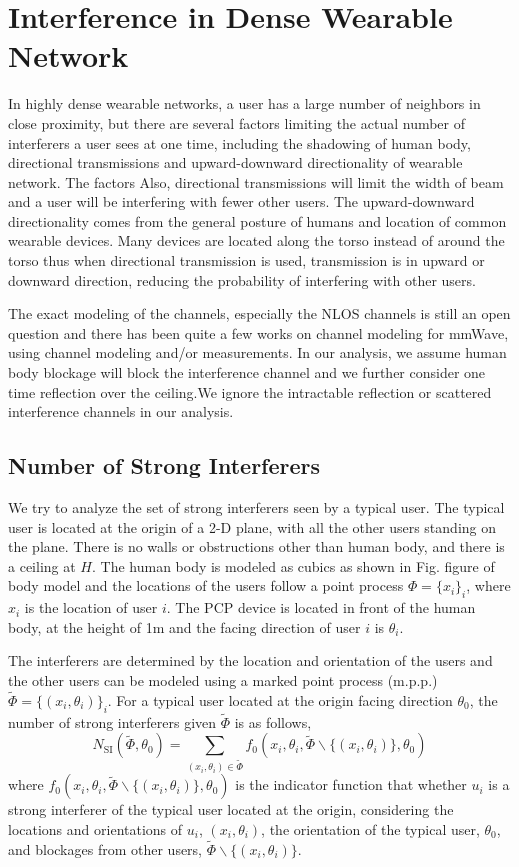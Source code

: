 \documentclass[10pt, conference, letterpaper]{IEEEtran}
\begin{document}
\section{Interference in Dense Wearable Network}\label{section:channel}
In highly dense wearable networks, a user has a large number of neighbors in close proximity, but there are several factors limiting the actual number of interferers a user sees at one time, including the shadowing of human body, directional transmissions and upward-downward directionality of wearable network. The factors Also, directional transmissions will limit the width of beam and a user will be interfering with fewer other users. The upward-downward directionality comes from the general posture of humans and location of common wearable devices. Many devices are located along the torso instead of around the torso thus when directional transmission is used, transmission is in upward or downward direction, reducing the probability of interfering with other users. 

The exact modeling of the channels, especially the NLOS channels is still an open question and there has been quite a few works on channel modeling for mmWave, using channel modeling and/or measurements. In our analysis, we assume human body blockage will block the interference channel and we further consider one time reflection over the ceiling.We ignore the intractable reflection or scattered interference channels in our analysis.
 
\subsection{Number of Strong Interferers}
We try to analyze the set of strong interferers seen by a typical user. The typical user is located at the origin of a 2-D plane, with all the other users standing on the plane. There is no walls or obstructions other than human body, and there is a ceiling at $H$. The human body is modeled as cubics as shown in Fig. {figure of body model} and the locations of the users follow a point process $\Phi=\{x_i\}_i$, where $x_i$ is the location of user $i$. The PCP device is located in front of the human body, at the height of 1m and the facing direction of user $i$ is $\theta_i$. 

The interferers are determined by the location and orientation of the users and the other users can be modeled using a marked point process (m.p.p.) $\tilde{\Phi}=\{(x_i, \theta_i)\}_i$. For a typical user located at the origin facing direction $\theta_0$, the number of strong interferers given $\tilde{\Phi}$ is as follows,
\begin{equation}
N_{\mathrm{SI}}(\tilde{\Phi}, \theta_0) = \sum_{(x_i, \theta_i)\in \tilde{\Phi}}f_0(x_i, \theta_i, \tilde{\Phi}\backslash\{(x_i,\theta_i)\}, \theta_0)
\end{equation}
where $f_0(x_i, \theta_i, \tilde{\Phi}\backslash\{(x_i,\theta_i)\}, \theta_0)$ is the indicator function that whether $u_i$ is a strong interferer of the typical user located at the origin, considering the locations and orientations of $u_i$, $(x_i, \theta_i)$, the orientation of the typical user, $\theta_0$, and blockages from other users, $\tilde{\Phi}\backslash\{(x_i,\theta_i)\}$. 
\end{document}
